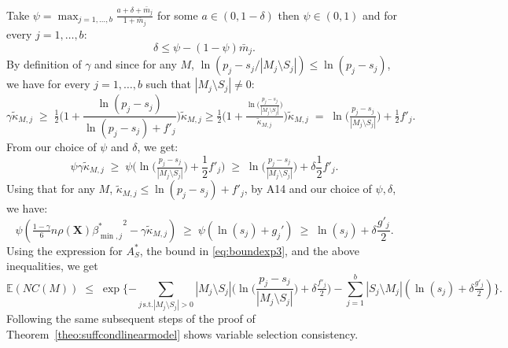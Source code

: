 \documentclass[aos]{imsart}
\theoremstyle{plain}
\newcommand{\E}{\mathbb{E}}
\newcommand{\bs}{\boldsymbol}
\begin{document}
Take $\psi=\max_{j=1, \ldots,b}\frac{a + \delta + \bar{m}_j}{1+\bar{m}_j}$ for some $a \in(0, 1- \delta)$ then $\psi \in (0,1)$ and for every $j=1,\ldots,b$:
$$\delta \leq \psi-(1-\psi)\bar{m}_j.$$ 
By definition of $\gamma$ and since for any $M$, $\ln(p_j-s_j/|M_j\setminus S_j|) \leq \ln(p_j-s_j)$, we have for every $j=1,\ldots,b$ such that $|M_j \setminus S_j|\neq0$:
$$
\gamma\tilde{\kappa}_{M, j}\;\geq\;\tfrac12 \bigg(1+\frac{\ln(p_j-s_j)}{\ln(p_j-s_j) + f'_j}\bigg)\tilde{\kappa}_{M, j}\geq \tfrac12 \bigg(1+\tfrac{\ln\big(\tfrac{p_j-s_j}{|M_j\setminus S_j|}\big)}{\tilde{\kappa}_{M, j}}\bigg)\tilde{\kappa}_{M, j} \;=\; \ln\big(\tfrac{p_j-s_j}{|M_j\setminus S_j|}\big)+ \tfrac12f'_j.
$$
From our choice of $\psi$ and $\delta$, we get:
$$\psi\gamma\tilde{\kappa}_{M, j} \;\geq\; \psi\bigg(\ln\big(\tfrac{p_j-s_j}{|M_j\setminus S_j|}\big)+ \frac12f'_j\bigg) \;\geq\; \ln\big(\tfrac{p_j-s_j}{|M_j\setminus S_j|}\big)+ \delta\frac12f'_j.$$
Using that for any $M$, $\tilde{\kappa}_{M, j} \leq \ln(p_j-s_j)+f'_j$, by A14 and our choice of $\psi,\delta$, we have:
$$\psi\left(\tfrac{1-\gamma}{6} n \rho(\bs X) {\beta^*_{\min,j}}^{2} - \gamma\tilde{\kappa}_{M, j}\right) \;\geq\; \psi\left(\ln(s_j)+g_j'\right) \;\geq\; \ln(s_j)+\delta \frac{g'_j}{2}.
$$
Using the expression for $A_S^*$, the bound in \eqref{eq:boundexp3}, and the above inequalities, we get
$$
\E(NC(M))\;\leq\;\exp\{- \sum_{j\, \text{s.t.} |M_j \setminus S_j| > 0} |M_j\setminus S_j|\bigg(\ln\bigg(\frac{p_j-s_j}{|M_j\setminus S_j|}\bigg)+\delta \tfrac{f'_j}{2}\bigg)-\sum_{j=1}^b |S_j\setminus M_j|(\ln(s_j)+\delta \tfrac{g'_j}{2})\}.
$$
Following the same subsequent steps of the proof of Theorem~\ref{theo:suffcondlinearmodel} shows variable selection consistency.
\end{document}
